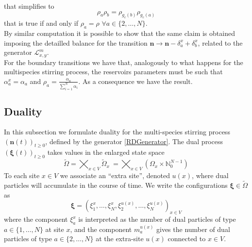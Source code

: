 \documentclass[11pt]{article}
\numberwithin{equation}{section}
\numberwithin{equation}{subsection}
\begin{document}
that simplifies to 
\begin{equation}
	\rho_{a}\rho_{b}=\rho_{g_{c}(b)}\rho_{g_{c}(a)}
\end{equation}
that is true if and only if $\rho_{a}=\rho$ $\forall a\in \{2,\ldots,N\}$.\\
By similar computation it is possible to show that the same claim is obtained imposing the detailled balance for the transition $\bm{n}\to \bm{n}-\delta_{a}^{x}+\delta_{b}^{x}$, related to the generator $\mathcal{L}^{m}_{x,y}$. \\
For the boundary transitions we have that, analogously to what happens for the multispecies stirring process, the reservoirs parameters must be such that $\alpha_{a}^{x}=\alpha_{a}$ and $\rho_{a}=\frac{\alpha_{a}}{\sum_{i=1}^{N}\alpha_{i}}$. As a consequence we have the result. 
\subsection{Duality}
In this subsection we formulate duality for the multi-species stirring process $(\mathbf{n}(t))_{t\geq 0}$, defined by the generator \eqref{RDGenerator}.
The dual  process $(\bm{\xi}(t))_{t\geq 0}$ takes values in the enlarged state space
\begin{equation}
	\widetilde{\Omega}= \bigtimes_{x\in V} \widetilde{\Omega}_{x}\ = \bigtimes_{x\in V} (\Omega_{x}\times \mathbb{N}_{0}^{N-1})
\end{equation}
To each site $x\in V$ we associate an ``extra site'', denoted $u(x)$,
where dual particles will accumulate in the course of time. 
We write the configurations $\bm{\xi} \in \widetilde\Omega$  as
\begin{equation}
	\bm{\xi}=\left(\xi_{1}^{x},\ldots,\xi_{N}^{x},\xi_{2}^{u(x)},\ldots,\xi_{N}^{u(x)}\right)_{x\in V}
\end{equation}
where the component $\xi_{a}^{x}$ is interpreted as the number of dual particles of type $a\in \{1,\ldots,N\}$ at site $x$, 
and the component $m_{a}^{u(x)}$  gives the number of dual particles of type $a\in \{2,\ldots,N\}$ at 
the extra-site $u(x)$ connected to $x\in V$.
\end{document}
